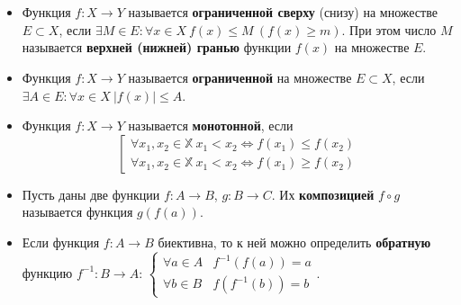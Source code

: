 \documentclass{article}
\begin{document}
\section{\centering}
\noindent{}
\begin{itemize}
    \item Функция \(f: X \to Y\) называется \textbf{ограниченной сверху} (снизу) на множестве \(E \subset X\), если \(\exists M \in E: \forall x \in X\ f(x) \leq M\ (f(x) \geq m)\). При этом число \(M\) называется \textbf{верхней (нижней) гранью} функции \(f(x)\) на множестве \(E\).      
    \item Функция \(f: X \to Y\) называется \textbf{ограниченной} на множестве \(E \subset X\), если \(\exists A \in E: \forall x \in X\ |f(x)| \leq  A\).   
    \item Функция \(f: X \to Y\) называется \textbf{монотонной}, если
    \[
        \left[
            \begin{gathered}
                \forall x_1, x_2 \in \mathbb{X}\ x_1 < x_2 \iff  f(x_1) \leq f(x_2)\\
                \forall x_1, x_2 \in \mathbb{X}\ x_1 < x_2 \iff  f(x_1) \geq f(x_2)
            \end{gathered}
        \right.
    \]
    \item Пусть даны две функции \(f: A \to B\), \(g: B \to C\). Их \textbf{композицией} \(f \circ g\) называется функция \(g(f(a))\).
    \item Если функция \(f: A \to B\) биективна, то к ней можно определить \textbf{обратную} функцию \(f^{-1}: B \to A\): \(
    \begin{cases}
        \forall a \in A & f^{-1}(f(a)) = a\\
        \forall b \in B & f(f^{-1}(b)) = b 
    \end{cases}
    \). 
\end{itemize}

\end{document}
